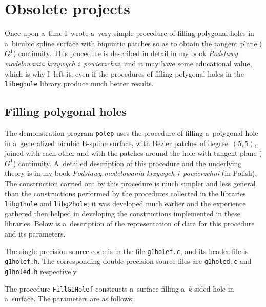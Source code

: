 

\chapter{Obsolete projects}

Once upon a~time I~wrote a~very simple procedure of filling polygonal holes
in a~bicubic spline surface with biquintic patches so as to obtain the
tangent plane ($G^1$) continuity. This procedure is described in detail in
my book \emph{Podstawy mo\-de\-lo\-wa\-nia krzywych i~powierzchni}, and it may
have some educational value, which is why I~left it, even if the procedures
of filling polygonal holes in the \texttt{libeghole} library produce much
better results.

\section{\label{sect:obsolete:G1}Filling polygonal holes}

The demonstration program \texttt{polep} uses the procedure of filling
a~polygonal hole in a~generalized bicubic B-spline surface, with B\'{e}zier
patches of degree~$(5,5)$, joined with each other and with the patches
around the hole with tangent plane ($G^1$) continuity. A~detailed description
of this procedure and the underlying theory is in my book
\emph{Podstawy modelowania krzywych i~powierzchni} (in Polish).
The construction carried out by this procedure is much simpler and
less general than the constructions performed by the procedures
collected in the libraries \texttt{libg1hole} and \texttt{libg2hole};
it was developed much earlier and the experience gathered then helped
in developing the constructions implemented in these libraries.
Below is a~description of the representation of data for this procedure
and its parameters.

The single precision source code is in the file \texttt{g1holef.c},
and its header file is \texttt{g1holef.h}.
The corresponding double precision source files are \texttt{g1holed.c}
and \texttt{g1holed.h} respectively.

\vspace{\bigskipamount}
The procedure \texttt{FillG1Holef} constructs a~surface filling a~$k$-sided hole
in a~surface. The parameters are as follows:

